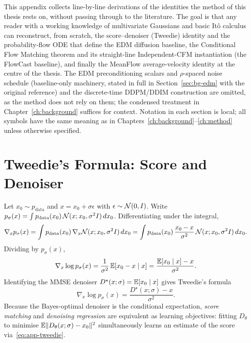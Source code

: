 
\label{app:derivations}

This appendix collects line-by-line derivations of the identities the method of this thesis rests on, without passing through to the literature. The goal is that any reader with a working knowledge of multivariate Gaussians and basic It\^o calculus can reconstruct, from scratch, the score--denoiser (Tweedie) identity and the probability-flow ODE that define the EDM diffusion baseline, the Conditional Flow Matching theorem and its straight-line Independent-CFM instantiation (the FlowCast baseline), and finally the MeanFlow average-velocity identity at the centre of the thesis. The EDM preconditioning scalars and $\rho$-spaced noise schedule (baseline-only machinery, stated in full in Section~\ref{sec:bg-edm} with the original reference) and the discrete-time DDPM/DDIM construction are omitted, as the method does not rely on them; the condensed treatment in Chapter~\ref{ch:background} suffices for context. Notation in each section is local; all symbols have the same meaning as in Chapters~\ref{ch:background}--\ref{ch:method} unless otherwise specified.

\section{Tweedie's Formula: Score and Denoiser}
\label{app:tweedie}

Let $x_0 \sim p_{\text{data}}$ and $x = x_0 + \sigma\epsilon$ with $\epsilon \sim \mathcal{N}(0, I)$. Write $p_\sigma(x) = \int p_{\text{data}}(x_0)\,\mathcal{N}(x; x_0, \sigma^2 I)\,dx_0$. Differentiating under the integral,
\begin{equation*}
  \nabla_x p_\sigma(x) = \int p_{\text{data}}(x_0)\,\nabla_x \mathcal{N}(x; x_0, \sigma^2 I)\,dx_0 = \int p_{\text{data}}(x_0)\,\frac{x_0 - x}{\sigma^2}\,\mathcal{N}(x; x_0, \sigma^2 I)\,dx_0.
\end{equation*}
Dividing by $p_\sigma(x)$,
\begin{equation*}
  \nabla_x \log p_\sigma(x) = \frac{1}{\sigma^2}\,\mathbb{E}[x_0 - x \mid x] = \frac{\mathbb{E}[x_0 \mid x] - x}{\sigma^2}.
\end{equation*}
Identifying the MMSE denoiser $D^\star(x; \sigma) = \mathbb{E}[x_0 \mid x]$ gives Tweedie's formula
\begin{equation}
  \boxed{\;\nabla_x \log p_\sigma(x) = \frac{D^\star(x; \sigma) - x}{\sigma^2}.\;}
  \label{eq:app-tweedie}
\end{equation}
Because the Bayes-optimal denoiser is the conditional expectation, \emph{score matching} and \emph{denoising regression} are equivalent as learning objectives: fitting $D_\theta$ to minimise $\mathbb{E}\|D_\theta(x; \sigma) - x_0\|^2$ simultaneously learns an estimate of the score via~\eqref{eq:app-tweedie}.


